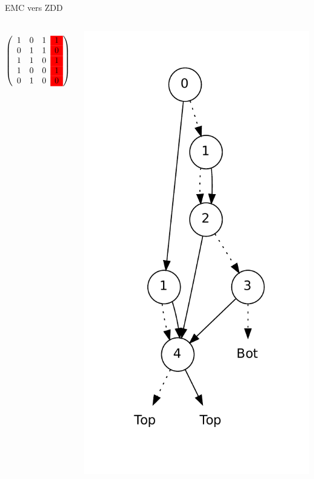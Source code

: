 \documentclass{beamer}
\begin{document}
\begin{frame}{EMC vers ZDD}
  \begin{columns}

  \begin{displaymath}
   \left(\begin{array}{ c c c c c }
   1 & 0 & 1 &\cellcolor{red} 1 \\
   0 & 1 & 1 &\cellcolor{red} 0 \\
   1 & 1 & 0 &\cellcolor{red} 1 \\
   1 & 0 & 0 &\cellcolor{red} 1 \\
   0 & 1 & 0 &\cellcolor{red} 0
  \end{array}\right)
  \end{displaymath}

    \includegraphics[height=0.9\textheight]{../imports/column.pdf}
  \end{columns}
\end{frame}
\end{document}
